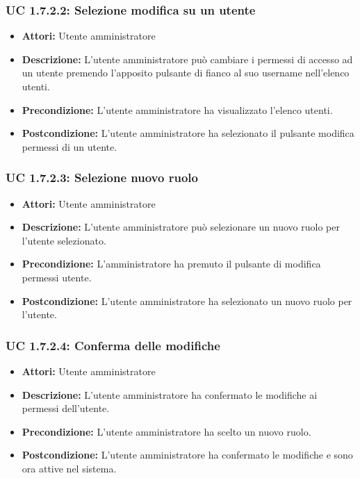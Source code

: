 \subsubsection{UC 1.7.2.2: Selezione modifica su un utente}

\begin{itemize}
\item \textbf{Attori:} Utente amministratore
\item \textbf{Descrizione:} L'utente amministratore può cambiare i permessi di accesso ad un utente premendo l'apposito pulsante di fianco al suo username nell'elenco utenti.
\item \textbf{Precondizione:} L'utente amministratore ha visualizzato l'elenco utenti.
\item \textbf{Postcondizione:} L'utente amministratore ha selezionato il pulsante modifica permessi di un utente.
\end{itemize}

\subsubsection{UC 1.7.2.3: Selezione nuovo ruolo}

\begin{itemize}
\item \textbf{Attori:} Utente amministratore
\item \textbf{Descrizione:} L'utente amministratore può selezionare un nuovo ruolo per l'utente selezionato.
\item \textbf{Precondizione:} L'amministratore ha premuto il pulsante di modifica permessi utente.
\item \textbf{Postcondizione:} L'utente amministratore ha selezionato un nuovo ruolo per l'utente.
\end{itemize}

\subsubsection{UC 1.7.2.4: Conferma delle modifiche}

\begin{itemize}
\item \textbf{Attori:} Utente amministratore
\item \textbf{Descrizione:} L'utente amministratore ha confermato le modifiche ai permessi dell'utente.
\item \textbf{Precondizione:} L'utente amministratore ha scelto un nuovo ruolo.
\item \textbf{Postcondizione:} L'utente amministratore ha confermato le modifiche e sono ora attive nel sistema.
\end{itemize}

